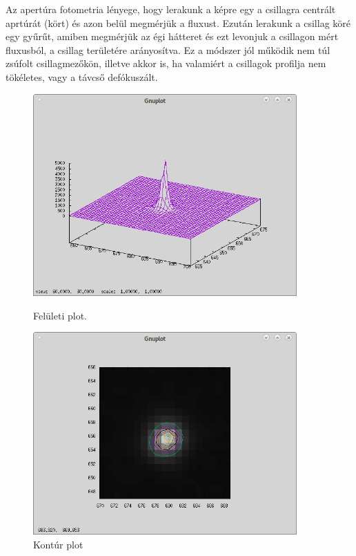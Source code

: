 \documentclass{article}
\begin{document}
Az apertúra fotometria lényege, hogy lerakunk a képre egy a csillagra centrált
aprtúrát (kört) és azon belül megmérjük a fluxust. Ezután lerakunk a csillag
köré egy gyűrűt, amiben megmérjük az égi hátteret és ezt levonjuk a csillagon
mért fluxusból, a csillag területére arányosítva.
Ez a módszer jól működik nem túl zsúfolt csillagmezőkön, illetve akkor is, ha
valamiért a csillagok profilja nem tökéletes, vagy a távcső defókuszált.

\begin{figure}[ht!]
    \centering
    \begin{minipage}{0.45\textwidth}
        \centering
        \includegraphics[width=0.9\textwidth]{pics/surface.png} %
        \caption{Felületi plot.}
        \label{surfaceplot}
    \end{minipage}\hfill
    \begin{minipage}{0.45\textwidth}
        \centering
        \includegraphics[width=0.9\textwidth]{pics/area.png} %
        \caption{Kontúr plot}
        \label{areap}
    \end{minipage}
\end{figure}
\end{document}
